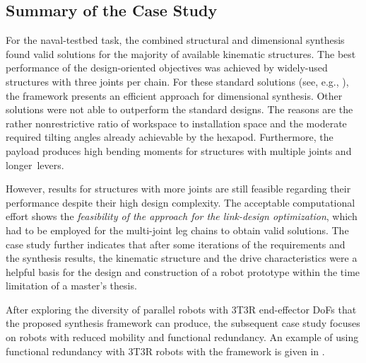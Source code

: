 \subsection{Summary of the Case Study}
\label{sec:eval_lufi_summary}


%
%
%
%
%
%

For the naval-testbed task, the combined structural and dimensional synthesis found valid solutions for the majority of available kinematic structures.
The best performance of the design-oriented objectives was achieved by widely-used structures with three joints per chain.
For these standard solutions (see, e.g., \cite{FrindtKreHes2010}), the framework presents an efficient approach for dimensional synthesis.
%
Other solutions were not able to outperform the standard designs. 
The reasons are the rather nonrestrictive ratio of workspace to installation space and the moderate required tilting angles already achievable by the hexapod. %
Furthermore, the payload produces high bending moments for structures with multiple joints and longer~levers.
%

However, results for structures with more joints are still feasible regarding their performance despite their high design complexity.
The acceptable computational effort shows the \emph{feasibility of the approach for the link-design optimization}, which had to be employed for the multi-joint leg chains to obtain valid solutions.
%
The case study further indicates that after some iterations of the requirements and the synthesis results, the kinematic structure and the drive characteristics were a helpful basis for the design and construction of a robot prototype within the time limitation of a master's thesis.

%
%
%
%

After exploring the diversity of parallel robots with 3T3R end-effector DoFs that the proposed synthesis framework can produce, the subsequent case study focuses on robots with reduced mobility and functional redundancy. An example of using functional redundancy with 3T3R robots with the framework is given in \cite{SterneckFetSch2023}.
